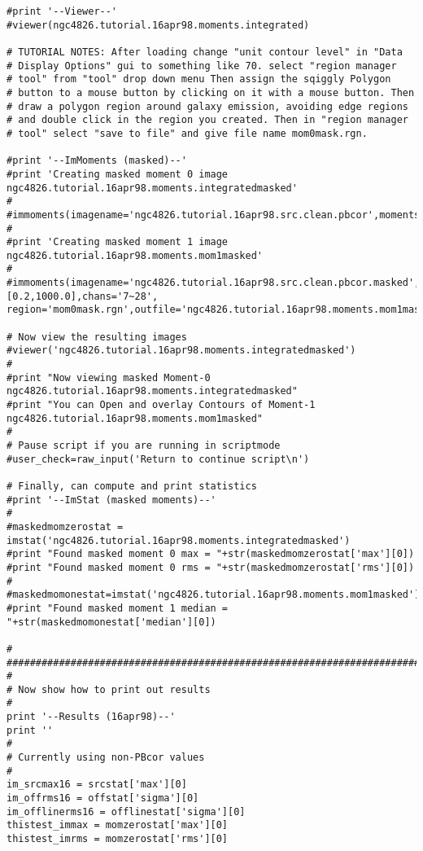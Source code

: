 \begin{verbatim}
#print '--Viewer--'
#viewer(ngc4826.tutorial.16apr98.moments.integrated)

# TUTORIAL NOTES: After loading change "unit contour level" in "Data
# Display Options" gui to something like 70. select "region manager
# tool" from "tool" drop down menu Then assign the sqiggly Polygon
# button to a mouse button by clicking on it with a mouse button. Then
# draw a polygon region around galaxy emission, avoiding edge regions
# and double click in the region you created. Then in "region manager
# tool" select "save to file" and give file name mom0mask.rgn.

#print '--ImMoments (masked)--'
#print 'Creating masked moment 0 image ngc4826.tutorial.16apr98.moments.integratedmasked'
#	
#immoments(imagename='ngc4826.tutorial.16apr98.src.clean.pbcor',moments=0,axis='spectral',chans='7~28',region='mom0mask.rgn',outfile='ngc4826.tutorial.16apr98.moments.integratedmasked') 
#
#print 'Creating masked moment 1 image ngc4826.tutorial.16apr98.moments.mom1masked'
#
#immoments(imagename='ngc4826.tutorial.16apr98.src.clean.pbcor.masked',moments=1,axis='spectral',includepix=[0.2,1000.0],chans='7~28', region='mom0mask.rgn',outfile='ngc4826.tutorial.16apr98.moments.mom1masked') 

# Now view the resulting images
#viewer('ngc4826.tutorial.16apr98.moments.integratedmasked')
#
#print "Now viewing masked Moment-0 ngc4826.tutorial.16apr98.moments.integratedmasked"
#print "You can Open and overlay Contours of Moment-1 ngc4826.tutorial.16apr98.moments.mom1masked"
#
# Pause script if you are running in scriptmode
#user_check=raw_input('Return to continue script\n')

# Finally, can compute and print statistics
#print '--ImStat (masked moments)--'
#
#maskedmomzerostat = imstat('ngc4826.tutorial.16apr98.moments.integratedmasked')
#print "Found masked moment 0 max = "+str(maskedmomzerostat['max'][0])
#print "Found masked moment 0 rms = "+str(maskedmomzerostat['rms'][0])
#
#maskedmomonestat=imstat('ngc4826.tutorial.16apr98.moments.mom1masked')
#print "Found masked moment 1 median = "+str(maskedmomonestat['median'][0])

#
##########################################################################
#
# Now show how to print out results
#
print '--Results (16apr98)--'
print ''
#
# Currently using non-PBcor values
#
im_srcmax16 = srcstat['max'][0]
im_offrms16 = offstat['sigma'][0]
im_offlinerms16 = offlinestat['sigma'][0]
thistest_immax = momzerostat['max'][0]
thistest_imrms = momzerostat['rms'][0]


\end{verbatim}
